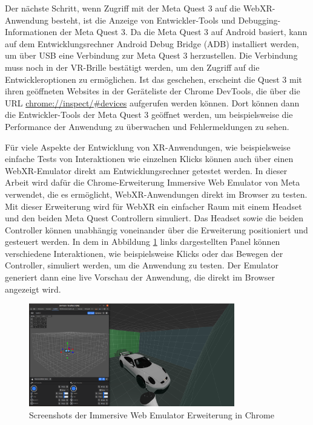 Der nächste Schritt, wenn Zugriff mit der Meta Quest 3 auf die WebXR-Anwendung besteht, ist die Anzeige von Entwickler-Tools und Debugging-Informationen der Meta Quest 3.
Da die Meta Quest 3 auf Android basiert, kann auf dem Entwicklungsrechner Android Debug Bridge (ADB) installiert werden, um über USB eine Verbindung zur Meta Quest 3 herzustellen.
Die Verbindung muss noch in der VR-Brille bestätigt werden, um den Zugriff auf die Entwickleroptionen zu ermöglichen.
Ist das geschehen, erscheint die Quest 3 mit ihren geöffneten Websites in der Geräteliste der Chrome DevTools, die über die URL \url{chrome://inspect/#devices} aufgerufen werden können.
Dort können dann die Entwickler-Tools der Meta Quest 3 geöffnet werden, um beispielsweise die Performance der Anwendung zu überwachen und Fehlermeldungen zu sehen.


Für viele Aspekte der Entwicklung von XR-Anwendungen, wie beispielsweise einfache Tests von Interaktionen wie einzelnen Klicks können auch über einen WebXR-Emulator direkt am Entwicklungsrechner getestet werden.
In dieser Arbeit wird dafür die Chrome-Erweiterung Immersive Web Emulator von Meta verwendet, die es ermöglicht, WebXR-Anwendungen direkt im Browser zu testen.
Mit dieser Erweiterung wird für WebXR ein einfacher Raum mit einem Headset und den beiden Meta Quest Controllern simuliert.
Das Headset sowie die beiden Controller können unabhängig voneinander über die Erweiterung positioniert und gesteuert werden.
In dem in Abbildung \ref{fig:webxr-emulator} links dargestellten Panel können verschiedene Interaktionen, wie beispielsweise Klicks oder das Bewegen der Controller, simuliert werden, um die Anwendung zu testen.
Der Emulator generiert dann eine live Vorschau der Anwendung, die direkt im Browser angezeigt wird.

\begin{figure}[H]
    \centering
    \includegraphics[width=0.8\textwidth]{images/WebXR-Emulator.png}
    \caption{Screenshots der Immersive Web Emulator Erweiterung in Chrome}
    \label{fig:webxr-emulator}
\end{figure}

